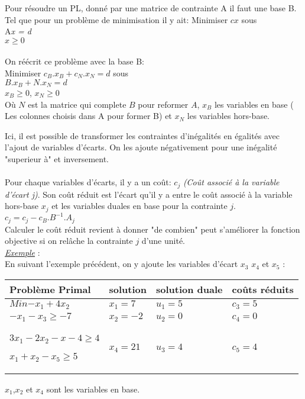 Pour résoudre un PL, donné par une matrice de contrainte A il faut une base B. Tel que pour un problème de minimisation il y ait:
\newline
\newline
\hspace{2.5cm}Minimiser $cx$ sous\\
\hspace*{2.5cm} A\textit{x = d} \\
\hspace*{2.5cm}\textit{ $x \geq 0$}
\\
\\
On réécrit ce problème avec la base B:\\
\hspace{2.5cm}Minimiser $c_B.x_B + c_N.x_N =d$ sous\\
\hspace{2.5cm}$B.x_B + N.x_N =d$\\
\hspace{2.5cm}\textit{ $x_B \geq 0$},\textit{ $x_N \geq 0$}\\

Où $N$ est la matrice qui complete $B$ pour reformer $A$, $x_B$ les variables en base ( Les colonnes choisis dans A pour former B) et  $x_N$ les variables hors-base.

Ici, il est possible de transformer les contraintes d'inégalités en égalités avec l'ajout de variables d'écarts. On les ajoute négativement pour une inégalité "superieur à" et inversement.\\
\\
Pour chaque variables d'écarts, il y a un coût: \textit{$c_j$} \textit{(Coût associé à la variable d'écart j)}.
Son coût réduit est l'écart qu'il y a entre le coût associé à la variable hors-base $x_j$ et les variables duales en base pour la contrainte $j$.\\
$c_j = c_j - c_B.B^{-1}.A_j$\\

Calculer le coût réduit revient à donner "de combien" peut s'améliorer la fonction objective si on relâche la contrainte $j$ d'une unité.
\newline
\\
\underline{\textit{Exemple}} : 
\\
En suivant l'exemple précédent, on y ajoute les variables d'écart $x_3$ $x_4$ et $x_5$ :\\
\begin{tabular}{ p{5 cm}p{3 cm}p{3 cm}p{3 cm}}
 \hline
Problème Primal  & solution & solution duale & coûts réduits \\
 \hline
$Min{ - x_1 + 4x_2}$ & $x_1 = 7$ & $u_1 = 5$ & $c_3 = 5$\\
$-x_1 -x_3 \geq -7$ 
&
$x_2 = -2$
&
$u_2 = 0$
&
$c_4 = 0$\\
$3x_1-2x_2 -x-4 \geq 4$

$x_1+x_2 -x_5 \geq 5$ & $x_4 = 21$ & $u_3 = 4$ & $c_5 = 4$\\
 \hline
\end{tabular}
$x_1$,$x_2$ et $x_4$ sont les variables en base.
